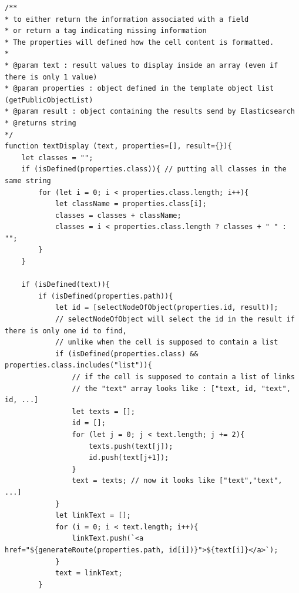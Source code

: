 \documentclass[a4paper,12pt,twoside]{book}
\begin{document}
\begin{lstlisting}
/**
* to either return the information associated with a field
* or return a tag indicating missing information
* The properties will defined how the cell content is formatted.
*
* @param text : result values to display inside an array (even if there is only 1 value)
* @param properties : object defined in the template object list (getPublicObjectList)
* @param result : object containing the results send by Elasticsearch
* @returns string
*/
function textDisplay (text, properties=[], result={}){
    let classes = "";
    if (isDefined(properties.class)){ // putting all classes in the same string
        for (let i = 0; i < properties.class.length; i++){
            let className = properties.class[i];
            classes = classes + className;
            classes = i < properties.class.length ? classes + " " : "";
        }
    }

    if (isDefined(text)){
        if (isDefined(properties.path)){
            let id = [selectNodeOfObject(properties.id, result)];
            // selectNodeOfObject will select the id in the result if there is only one id to find,
            // unlike when the cell is supposed to contain a list
            if (isDefined(properties.class) && properties.class.includes("list")){
                // if the cell is supposed to contain a list of links
                // the "text" array looks like : ["text, id, "text", id, ...]
                let texts = [];
                id = [];
                for (let j = 0; j < text.length; j += 2){
                    texts.push(text[j]);
                    id.push(text[j+1]);
                }
                text = texts; // now it looks like ["text","text", ...]
            }
            let linkText = [];
            for (i = 0; i < text.length; i++){
                linkText.push(`<a href="${generateRoute(properties.path, id[i])}">${text[i]}</a>`);
            }
            text = linkText;
        }


\end{lstlisting}
\end{document}
